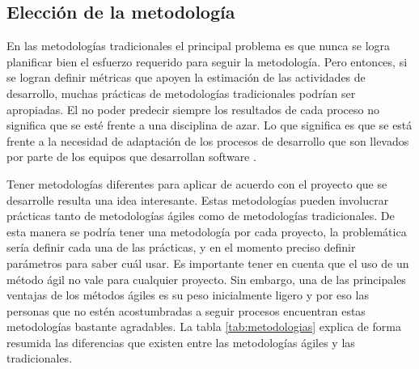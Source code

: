 \subsection{Elección de la metodología}
    
En las metodologías tradicionales el principal problema es que nunca se logra planificar 
bien el esfuerzo requerido para seguir la metodología. Pero entonces, si se logran definir 
métricas que apoyen la estimación de las actividades de desarrollo, muchas prácticas de 
metodologías tradicionales podrían ser apropiadas. El no poder predecir siempre los 
resultados de cada proceso no significa que se esté frente a una disciplina de azar. 
Lo que significa es que se está frente a la necesidad de adaptación de los procesos de 
desarrollo que son llevados por parte de los equipos que desarrollan software 
\citep{awad2005agile_v_traditional}.
    
Tener metodologías diferentes para aplicar de acuerdo con el proyecto que se desarrolle 
resulta una idea interesante. Estas metodologías pueden involucrar prácticas tanto de 
metodologías ágiles como de metodologías tradicionales. De esta manera se podría tener 
una metodología por cada proyecto, la problemática sería definir cada una de las 
prácticas, y en el momento preciso definir parámetros para saber cuál usar.
Es importante tener en cuenta que el uso de un método ágil no vale para cualquier proyecto. 
Sin embargo, una de las principales ventajas de los métodos ágiles es su peso inicialmente 
ligero y por eso las personas que no estén acostumbradas a seguir procesos encuentran 
estas metodologías bastante agradables. La tabla \ref{tab:metodologias} explica de forma resumida las diferencias que 
existen entre las metodologías ágiles y las tradicionales.
    
